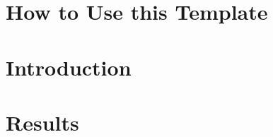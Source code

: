 \documentclass[remotesensing,article,submit,moreauthors,pdftex]{Definitions/mdpi}
\begin{document}

\setcounter{section}{-1} %
\section{How to Use this Template}

\section{Introduction}
 
\section{Results}
\end{document}
